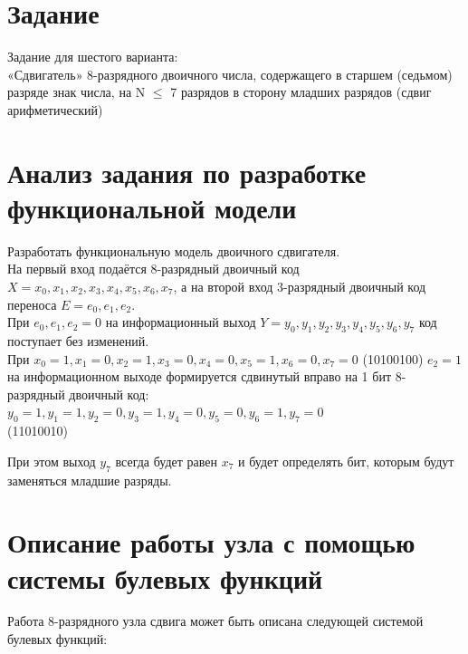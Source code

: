 \documentclass[oneside,a4paper,14pt]{extarticle}
\begin{document}
\newpage\thispagestyle{empty}
\newpage
\setcounter{page}{1}
\tableofcontents
\newpage

\section*{Задание}
Задание для шестого варианта:\\
«Сдвигатель» 8-разрядного двоичного числа, содержащего в старшем (седьмом) разряде знак числа, на N $\le$ 7 разрядов в сторону младших разрядов (сдвиг арифметический)

\section*{Анализ задания по разработке функциональной модели}

Разработать функциональную модель двоичного сдвигателя.\\

На первый вход подаётся 8-разрядный двоичный код\\$X=x_0,x_1,x_2,x_3,x_4,x_5,x_6,x_7$,
а на второй вход 3-разрядный двоичный код переноса $E=e_0,e_1,e_2$.\\

При $e_0,e_1,e_2=0$ на информационный выход $Y=y_0,y_1,y_2,y_3,y_4,y_5,y_6,y_7$ код поступает без изменений.\\

При $x_0=1,x_1=0,x_2=1,x_3=0,x_4=0,x_5=1,x_6=0,x_7=0$ (10100100) $e_2=1$ на информационном выходе формируется сдвинутый вправо на 1 бит 8-разрядный двоичный код:\\
$y_0=1,y_1=1,y_2=0,y_3=1,y_4=0,y_5=0,y_6=1,y_7=0$\\
(11010010)

При этом выход $y_7$ всегда будет равен $x_7$ и будет определять бит, которым будут заменяться младшие разряды.

\newpage
\section*{Описание работы узла с помощью системы булевых функций}
Работа 8-разрядного узла сдвига может быть описана следующей системой булевых функций:\\
\end{document}
